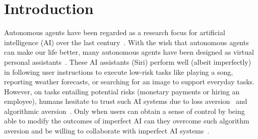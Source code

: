 \section{Introduction}

Autonomous agents have been regarded as a research focus for artificial intelligence (AI) over the last century~\cite{albrecht2018autonomous}. 
With the wish that autonomous agents can make our life better, many autonomous agents have been designed as virtual personal assistants~\cite{kepuska2018next}. 
These AI assistants (\eg Siri) perform well (albeit imperfectly) in following user instructions to execute low-risk tasks like playing a song, reporting weather forecasts, or searching for an image to support everyday tasks. %
However, on tasks entailing potential risks (\eg monetary payments or hiring an employee), humans hesitate to trust such AI systems due to loss aversion~\cite{tversky1991loss} and algorithmic aversion~\cite{hou2021expert,mahmud2022influences,dietvorst2015algorithm}. 
Only when users can obtain a sense of control by being able to modify the outcomes of imperfect AI can they overcome such algorithm aversion and be willing to collaborate with imperfect AI systems~\cite{dietvorst2018overcoming}. 


